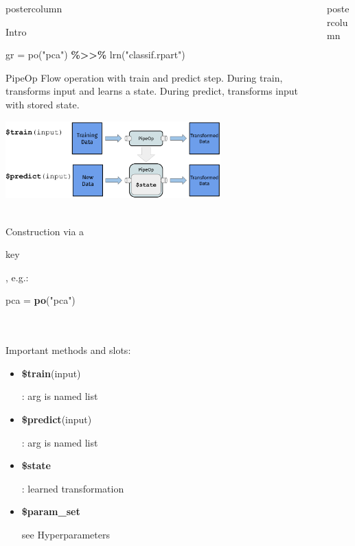 \documentclass{beamer}
\newlength{\columnheight} %
\newcommand{\codeinline}[1]{\begin{codeboxinline}#1\end{codeboxinline}}
\begin{document}
\begin{frame}[fragile]{}
\begin{columns}
\begin{column}{.245\textwidth}
\begin{beamercolorbox}[center]{postercolumn}
\begin{minipage}{.98\textwidth}
{\begin{myblock}{Intro}
\begin{codebox}
                gr = po("pca") \textbf{\%>{}>\%} lrn("classif.rpart")
              \end{codebox}
            \end{myblock}
						\begin{myblock}{PipeOp}
              \vspace{-0.5em}
              Flow operation with train and predict step. During train, transforms input and learns a state. During predict, transforms input with stored state.
              \begin{center}
                \includegraphics[width=0.7\textwidth]{img/po.pdf}
              \end{center}
              \ \\
              Construction via a \codeinline{key}, e.g.: \codeinline{pca = \textbf{po}("pca")} \\
              \ \\
              Important methods and slots:
              \begin{itemize}
                \item \codeinline{\textbf{\$train}(input)}: arg is named list
                \item \codeinline{\textbf{\$predict}(input)}: arg is named list
                \item \codeinline{\textbf{\$state}}: learned transformation
                \item \codeinline{\textbf{\$param\_set}} see Hyperparameters
              \end{itemize}
  			    \end{myblock}
           	\vfill}
				\end{minipage}
			\end{beamercolorbox}
		\end{column}
		\begin{column}{.245\textwidth}
			\begin{beamercolorbox}[center]{postercolumn}
				\begin{minipage}{.98\textwidth}
					\parbox[t][\columnheight]{\textwidth}{
}
\end{minipage}
\end{beamercolorbox}
\end{column}
\end{columns}
\end{frame}
\end{document}
